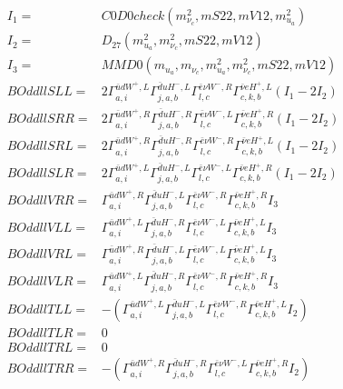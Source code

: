 \documentclass[A4,landscape]{article}
\begin{document}
\begin{align} 
I_1 = & C0D0check(m^2_{\nu_{{c}}}, mS22, mV12, m^2_{u_{{a}}}) \\ 
I_2 = & D_{27}(m^2_{u_{{a}}}, m^2_{\nu_{{c}}}, mS22, mV12) \\ 
I_3 = & MMD0(m_{u_{{a}}}, m_{\nu_{{c}}}, m^2_{u_{{a}}}, m^2_{\nu_{{c}}}, mS22, mV12) \\ 
  BOddllSLL= & 2  \Gamma^{\bar{u}d W^+,L}_{a, i} \Gamma^{\bar{d}u H^- ,L}_{j, a, b} \Gamma^{\bar{e}\nu W^- ,R}_{l, c} \Gamma^{\bar{\nu}e H^+,L}_{c, k, b} (I_1 - 2 I_2) \\ 
  BOddllSRR= & 2  \Gamma^{\bar{u}d W^+,R}_{a, i} \Gamma^{\bar{d}u H^- ,R}_{j, a, b} \Gamma^{\bar{e}\nu W^- ,L}_{l, c} \Gamma^{\bar{\nu}e H^+,R}_{c, k, b} (I_1 - 2 I_2) \\ 
  BOddllSRL= & 2  \Gamma^{\bar{u}d W^+,R}_{a, i} \Gamma^{\bar{d}u H^- ,R}_{j, a, b} \Gamma^{\bar{e}\nu W^- ,R}_{l, c} \Gamma^{\bar{\nu}e H^+,L}_{c, k, b} (I_1 - 2 I_2) \\ 
  BOddllSLR= & 2  \Gamma^{\bar{u}d W^+,L}_{a, i} \Gamma^{\bar{d}u H^- ,L}_{j, a, b} \Gamma^{\bar{e}\nu W^- ,L}_{l, c} \Gamma^{\bar{\nu}e H^+,R}_{c, k, b} (I_1 - 2 I_2) \\ 
  BOddllVRR= &  \Gamma^{\bar{u}d W^+,R}_{a, i} \Gamma^{\bar{d}u H^- ,L}_{j, a, b} \Gamma^{\bar{e}\nu W^- ,R}_{l, c} \Gamma^{\bar{\nu}e H^+,R}_{c, k, b} I_3 \\ 
  BOddllVLL= &  \Gamma^{\bar{u}d W^+,L}_{a, i} \Gamma^{\bar{d}u H^- ,R}_{j, a, b} \Gamma^{\bar{e}\nu W^- ,L}_{l, c} \Gamma^{\bar{\nu}e H^+,L}_{c, k, b} I_3 \\ 
  BOddllVRL= &  \Gamma^{\bar{u}d W^+,R}_{a, i} \Gamma^{\bar{d}u H^- ,L}_{j, a, b} \Gamma^{\bar{e}\nu W^- ,L}_{l, c} \Gamma^{\bar{\nu}e H^+,L}_{c, k, b} I_3 \\ 
  BOddllVLR= &  \Gamma^{\bar{u}d W^+,L}_{a, i} \Gamma^{\bar{d}u H^- ,R}_{j, a, b} \Gamma^{\bar{e}\nu W^- ,R}_{l, c} \Gamma^{\bar{\nu}e H^+,R}_{c, k, b} I_3 \\ 
  BOddllTLL= & -( \Gamma^{\bar{u}d W^+,L}_{a, i} \Gamma^{\bar{d}u H^- ,L}_{j, a, b} \Gamma^{\bar{e}\nu W^- ,R}_{l, c} \Gamma^{\bar{\nu}e H^+,L}_{c, k, b} I_2) \\ 
  BOddllTLR= & 0 \\ 
  BOddllTRL= & 0 \\ 
  BOddllTRR= & -( \Gamma^{\bar{u}d W^+,R}_{a, i} \Gamma^{\bar{d}u H^- ,R}_{j, a, b} \Gamma^{\bar{e}\nu W^- ,L}_{l, c} \Gamma^{\bar{\nu}e H^+,R}_{c, k, b} I_2) \\ 
\end{align} 
\end{document}
